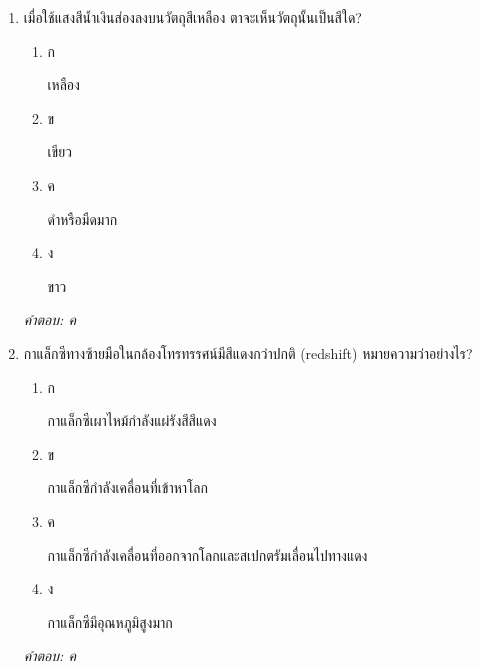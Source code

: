 \documentclass[12pt]{article}
\begin{document}
\begin{enumerate}[label=\arabic*., itemsep=0.5\baselineskip, topsep=0.5\baselineskip, leftmargin=*]
\item เมื่อใช้แสงสีน้ำเงินส่องลงบนวัตถุสีเหลือง ตาจะเห็นวัตถุนั้นเป็นสีใด?
\begin{enumerate}[label=\alph*)., itemsep=0.3\baselineskip, topsep=0.3\baselineskip]
\item ก\ 
\begin{minipage}[t]{0.9\linewidth}
\raggedright เหลือง
\end{minipage}
\item ข\ 
\begin{minipage}[t]{0.9\linewidth}
\raggedright เขียว
\end{minipage}
\item ค\ 
\begin{minipage}[t]{0.9\linewidth}
\raggedright ดำหรือมืดมาก
\end{minipage}
\item ง\ 
\begin{minipage}[t]{0.9\linewidth}
\raggedright ขาว
\end{minipage}
\end{enumerate}
\vspace{-0.3\baselineskip}
\begin{small}
\textit{คำตอบ: ค}
\end{small}

\item กาแล็กซีทางซ้ายมือในกล้องโทรทรรศน์มีสีแดงกว่าปกติ (redshift) หมายความว่าอย่างไร?
\begin{enumerate}[label=\alph*)., itemsep=0.3\baselineskip, topsep=0.3\baselineskip]
\item ก\ 
\begin{minipage}[t]{0.9\linewidth}
\raggedright กาแล็กซีเผาไหม้กำลังแผ่รังสีสีแดง
\end{minipage}
\item ข\ 
\begin{minipage}[t]{0.9\linewidth}
\raggedright กาแล็กซีกำลังเคลื่อนที่เข้าหาโลก
\end{minipage}
\item ค\ 
\begin{minipage}[t]{0.9\linewidth}
\raggedright กาแล็กซีกำลังเคลื่อนที่ออกจากโลกและสเปกตรัมเลื่อนไปทางแดง
\end{minipage}
\item ง\ 
\begin{minipage}[t]{0.9\linewidth}
\raggedright กาแล็กซีมีอุณหภูมิสูงมาก
\end{minipage}
\end{enumerate}
\vspace{-0.3\baselineskip}
\begin{small}
\textit{คำตอบ: ค}
\end{small}


\end{enumerate}
\end{document}
